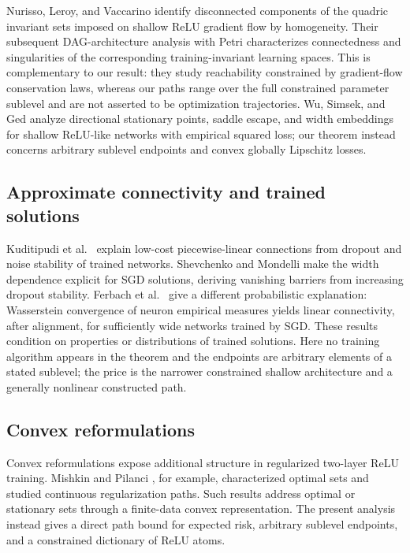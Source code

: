 \documentclass[pdflatex,sn-mathphys-num]{sn-jnl}
\theoremstyle{thmstyleone}
\theoremstyle{thmstyletwo}
\theoremstyle{thmstylethree}
\begin{document}
Nurisso, Leroy, and Vaccarino \cite{Nurisso2024} identify disconnected components of the quadric invariant sets imposed on shallow ReLU gradient flow by homogeneity. Their subsequent DAG-architecture analysis with Petri \cite{Nurisso2026} characterizes connectedness and singularities of the corresponding training-invariant learning spaces. This is complementary to our result: they study reachability constrained by gradient-flow conservation laws, whereas our paths range over the full constrained parameter sublevel and are not asserted to be optimization trajectories. Wu, Simsek, and Ged \cite{Wu2025} analyze directional stationary points, saddle escape, and width embeddings for shallow ReLU-like networks with empirical squared loss; our theorem instead concerns arbitrary sublevel endpoints and convex globally Lipschitz losses.

\subsection{Approximate connectivity and trained solutions}
Kuditipudi et al.~\cite{Kuditipudi2019} explain low-cost piecewise-linear connections from dropout and noise stability of trained networks. Shevchenko and Mondelli \cite{ShevchenkoMondelli2020} make the width dependence explicit for SGD solutions, deriving vanishing barriers from increasing dropout stability. Ferbach et al.~\cite{Ferbach2024} give a different probabilistic explanation: Wasserstein convergence of neuron empirical measures yields linear connectivity, after alignment, for sufficiently wide networks trained by SGD. These results condition on properties or distributions of trained solutions. Here no training algorithm appears in the theorem and the endpoints are arbitrary elements of a stated sublevel; the price is the narrower constrained shallow architecture and a generally nonlinear constructed path.

\subsection{Convex reformulations}
Convex reformulations expose additional structure in regularized two-layer ReLU training. Mishkin and Pilanci \cite{MishkinPilanci2023}, for example, characterized optimal sets and studied continuous regularization paths. Such results address optimal or stationary sets through a finite-data convex representation. The present analysis instead gives a direct path bound for expected risk, arbitrary sublevel endpoints, and a constrained dictionary of ReLU atoms.
\end{document}
